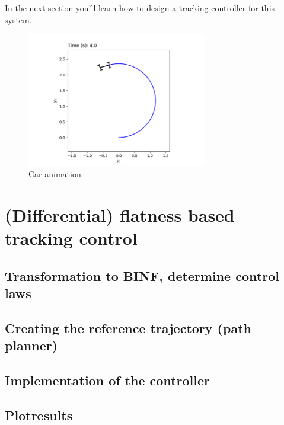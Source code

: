 \documentclass[a4paper,11pt,headings=standardclasses]{scrartcl}%
\begin{document}
In the next section you'll learn how to design a tracking controller for this system.
\begin{figure}[ht]
	\centering
	\includegraphics[width=0.7\textwidth]{img/animation}
	\caption{Car animation}
	\label{fig:animation}
\end{figure}
\section{(Differential) flatness based tracking control}
\subsection{Transformation to BINF, determine control laws}
\subsection{Creating the reference trajectory (path planner)}
\subsection{Implementation of the controller}
\subsection{Plotresults}
\end{document}
